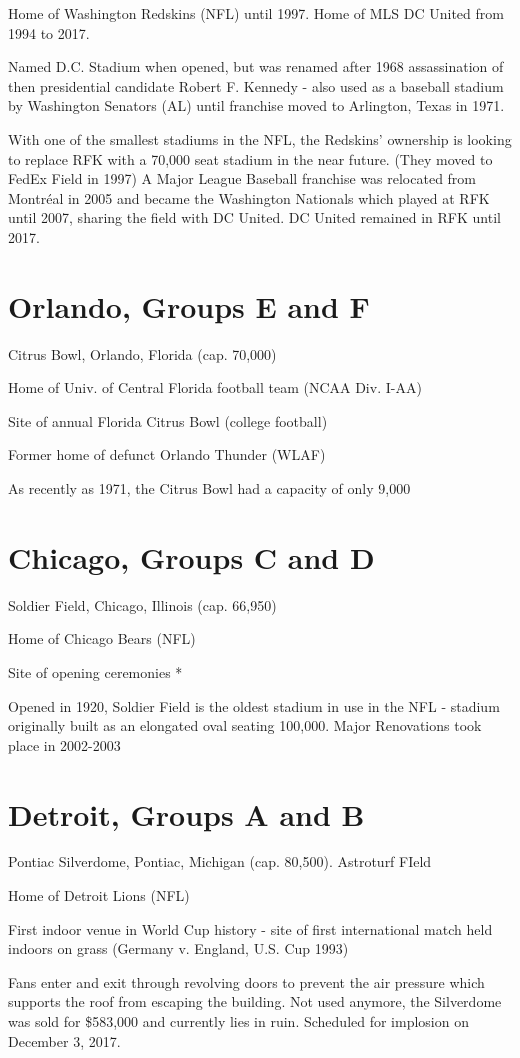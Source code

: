 Home of Washington Redskins (NFL) until 1997.  Home of MLS DC United from 1994 to 2017.

Named D.C. Stadium when opened, but was renamed after 1968 assassination of 
then presidential candidate Robert F. Kennedy - also used as a baseball stadium
by Washington Senators (AL) until franchise moved to Arlington, Texas in 1971.

With one of the smallest stadiums in the NFL, the Redskins' ownership is 
looking to replace RFK with a 70,000 seat stadium in the near future.  (They moved
to FedEx Field in 1997)  A Major League Baseball franchise was relocated from
Montr{\'e}al in 2005 and became the Washington Nationals which played at RFK until 2007,
sharing the field with DC United.  DC United remained in RFK until 2017.
\section{Orlando, Groups E and F}
Citrus Bowl, Orlando, Florida (cap. 70,000)

Home of Univ. of Central Florida football team (NCAA Div. I-AA)

Site of annual Florida Citrus Bowl (college football)

Former home of defunct Orlando Thunder (WLAF)

As recently as 1971, the Citrus Bowl had a capacity of only 9,000
\section{Chicago, Groups C and D}
Soldier Field, Chicago, Illinois (cap. 66,950)

Home of Chicago Bears (NFL)

Site of opening ceremonies *

Opened in 1920, Soldier Field is the oldest stadium in use in the NFL - stadium
originally built as an elongated oval seating 100,000.  Major Renovations took place 
in 2002-2003
\section{Detroit, Groups A and B}
Pontiac Silverdome, Pontiac, Michigan (cap. 80,500).  Astroturf FIeld

Home of Detroit Lions (NFL)

First indoor venue in World Cup history - site of first international match 
held indoors on grass (Germany v. England, U.S. Cup 1993)

Fans enter and exit through revolving doors to prevent the air pressure which 
supports the roof from escaping the building.  Not used anymore, the Silverdome was sold for \$583,000 and
currently lies in ruin.  Scheduled for implosion on December 3, 2017.

